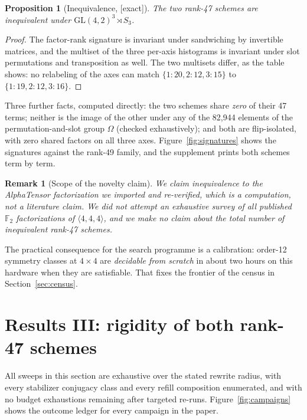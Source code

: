 \documentclass[11pt]{article}
\newtheorem{proposition}{Proposition}
\newtheorem{remark}{Remark}
\newcommand{\FF}{\mathbb{F}_2}
\newcommand{\tw}[3]{\langle #1,#2,#3\rangle}
\newcommand{\GL}{\mathrm{GL}}
\begin{document}
\begin{proposition}[Inequivalence, {[exact]}]
The two rank-47 schemes are inequivalent under $\GL(4,2)^3\rtimes S_3$.
\end{proposition}

\begin{proof}
The factor-rank signature is invariant under sandwiching by invertible matrices, and the multiset of the
three per-axis histograms is invariant under slot permutations and transposition as well. The two
multisets differ, as the table shows: no relabeling of the axes can match
$\{1{:}20,2{:}12,3{:}15\}$ to $\{1{:}19,2{:}12,3{:}16\}$.
\end{proof}

Three further facts, computed directly: the two schemes share \emph{zero} of their 47 terms; neither is
the image of the other under any of the 82{,}944 elements of the permutation-and-slot group $\Omega$
(checked exhaustively); and both are flip-isolated, with zero shared factors on all three axes.
Figure~\ref{fig:signatures} shows the signatures against the rank-49 family, and the supplement prints
both schemes term by term.

\begin{remark}[Scope of the novelty claim]
We claim inequivalence to the AlphaTensor factorization we imported and re-verified, which is a
computation, not a literature claim. We did not attempt an exhaustive survey of all published $\FF$
factorizations of $\tw444$, and we make no claim about the total number of inequivalent rank-47 schemes.
\end{remark}

The practical consequence for the search programme is a calibration: order-12 symmetry classes at
$4\times4$ are \emph{decidable from scratch} in about two hours on this hardware when they are
satisfiable. That fixes the frontier of the census in Section~\ref{sec:census}.

\section{Results III: rigidity of both rank-47 schemes}
\label{sec:rigidity}

All sweeps in this section are exhaustive over the stated rewrite radius, with every stabilizer conjugacy
class and every refill composition enumerated, and with no budget exhaustions remaining after targeted
re-runs. Figure~\ref{fig:campaigns} shows the outcome ledger for every campaign in the paper.
\end{document}
